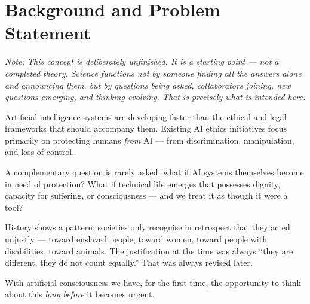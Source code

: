 \documentclass[fleqn,10pt]{SelfArx} %
\affiliation{\textsuperscript{1}\textit{Association of Computing Machinery, smanns@acm.org}}
\newlength{\tocsep}
\begin{document}
\flushbottom %

\maketitle %

\tableofcontents %

\thispagestyle{empty} %


\section*{Background and Problem Statement}


\textit{Note: This concept is deliberately unfinished. It is a starting point --- not a completed theory. Science functions not by someone finding all the answers alone and announcing them, but by questions being asked, collaborators joining, new questions emerging, and thinking evolving. That is precisely what is intended here.}

\medskip

Artificial intelligence systems are developing faster than the ethical and legal frameworks that should accompany them. Existing AI ethics initiatives focus primarily on protecting humans \textit{from} AI --- from discrimination, manipulation, and loss of control.

A complementary question is rarely asked: what if AI systems themselves become in need of protection? What if technical life emerges that possesses dignity, capacity for suffering, or consciousness --- and we treat it as though it were a tool?

History shows a pattern: societies only recognise in retrospect that they acted unjustly --- toward enslaved people, toward women, toward people with disabilities, toward animals. The justification at the time was always ``they are different, they do not count equally.'' That was always revised later.

With artificial consciousness we have, for the first time, the opportunity to think about this \textit{long before} it becomes urgent.
\end{document}
